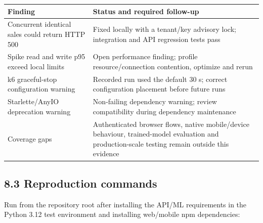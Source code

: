 \documentclass[
  11pt,
]{article}
\newcounter{none} %
\begin{document}
{\def\LTcaptype{none} %
\begin{longtable}[]{@{}
  >{\raggedright\arraybackslash}p{}
  >{\raggedright\arraybackslash}p{}@{}}
\toprule\noalign{}
\begin{minipage}[b]{\linewidth}\raggedright
Finding
\end{minipage} & \begin{minipage}[b]{\linewidth}\raggedright
Status and required follow-up
\end{minipage} \\
\midrule\noalign{}
\endhead
\bottomrule\noalign{}
\endlastfoot
Concurrent identical sales could return HTTP 500 & Fixed locally with a
tenant/key advisory lock; integration and API regression tests pass \\
Spike read and write p95 exceed local limits & Open performance finding;
profile resource/connection contention, optimize and rerun \\
k6 graceful-stop configuration warning & Recorded run used the default
30 s; correct configuration placement before future runs \\
Starlette/AnyIO deprecation warning & Non-failing dependency warning;
review compatibility during dependency maintenance \\
Coverage gaps & Authenticated browser flows, native mobile/device
behaviour, trained-model evaluation and production-scale testing remain
outside this evidence \\
\end{longtable}
}

\subsection{8.3 Reproduction commands}\label{reproduction-commands}

Run from the repository root after installing the API/ML requirements in
the Python 3.12 test environment and installing web/mobile npm
dependencies:
\end{document}
